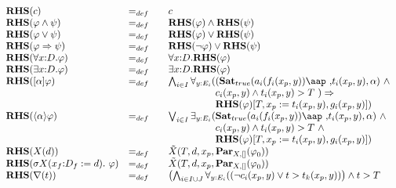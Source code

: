\documentclass{article}
\begin{document}
\begin{equation*}
\begin{array}{lll}
{\mathbf{RHS}}(c) & =_{def} & c \\
{\mathbf{RHS}}(\varphi \wedge \psi ) & =_{def} & {\mathbf{RHS}}(\varphi
)\wedge {\mathbf{RHS}}(\psi ) \\
{\mathbf{RHS}}(\varphi \vee \psi ) & =_{def} & {\mathbf{RHS}}(\varphi )\vee {%
\mathbf{RHS}}(\psi ) \\
{\mathbf{RHS}}(\varphi \Rightarrow \psi ) & =_{def} & {\mathbf{RHS}}(\lnot
\varphi )\vee {\mathbf{RHS}}(\psi ) \\
{\mathbf{RHS}}(\forall {x{:}D}.\varphi ) & =_{def} & \forall {x{:}D}.{%
\mathbf{RHS}}(\varphi ) \\
{\mathbf{RHS}}(\exists {x{:}D}.\varphi ) & =_{def} & \exists {x{:}D}.{%
\mathbf{RHS}}(\varphi ) \\
{\mathbf{RHS}}([\alpha ]\varphi ) & =_{def} & \bigwedge_{i{\in }I}\forall _{y%
{:}E_{i}}((\mathbf{Sat}_{true}(a_{i}(f_{i}(x_{p},y))\mbox{\aap ,}%
t_{i}(x_{p},y),\alpha )\ \wedge \\
&  & \phantom{\bigwedge_{i {\in} I} \forall_{y {:} E_i}(}c_{i}(x_{p},y)%
\wedge t_{i}(x_{p},y)>T\ )\Rightarrow \\
&  & \phantom{\bigwedge_{i {\in} I} \forall_{y {:} E_i}(} {\mathbf{RHS}}%
(\varphi )[T,x_{p}:=t_{i}(x_{p},y),g_{i}(x_{p},y)]) \\
{\mathbf{RHS}}(\langle \alpha \rangle \varphi ) & =_{def} & \bigvee_{i{\in }%
I}\exists _{y{:}E_{i}}(\mathbf{Sat}_{true}(a_{i}(f_{i}(x_{p},y))%
\mbox{\aap
,}t_{i}(x_{p},y),\alpha )\ \wedge \\
&  & \phantom{\bigvee_{i {\in} I} \exists_{y {:} E_i}(}c_{i}(x_{p},y)\wedge
t_{i}(x_{p},y)>T\ \wedge \\
&  & \phantom{\bigvee_{i {\in} I} \exists_{y {:} E_i}(} {\mathbf{RHS}}%
(\varphi )[T,x_{p}:=t_{i}(x_{p},y),g_{i}(x_{p},y)]) \\
{\mathbf{RHS}}(X(d)) & =_{def} & \tilde{X}(T,d,x_{p},\mathbf{Par}%
_{X,[]}(\varphi _{0})) \\
{\mathbf{RHS}}(\sigma X(x_{f}{:}D_{f}:=d).~\varphi ) & =_{def}~~~ & \tilde{X}%
(T,d,x_{p},\mathbf{Par}_{X,[]}(\varphi _{0})) \\
{\mathbf{RHS}}(\nabla (t)) & =_{def} & \left( \bigwedge_{i{\in }I\cup
J}\forall _{y{:}E_{i}}((\lnot c_{i}(x_{p},y)\vee t>t_{k}(x_{p},y))\right)
\wedge t>T \\

\end{array}
\end{equation*}
\end{document}
